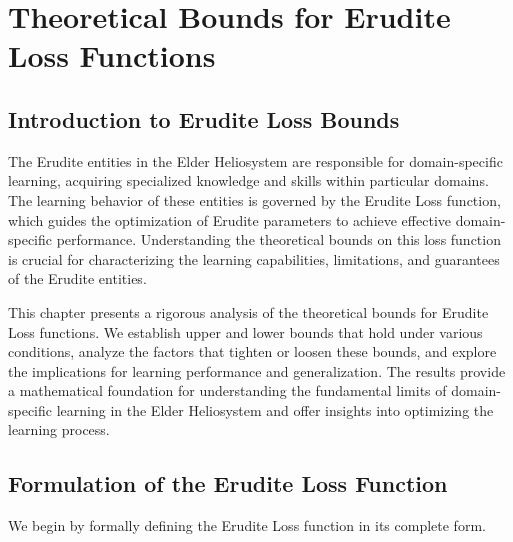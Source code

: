 \chapter{Theoretical Bounds for Erudite Loss Functions}

\section{Introduction to Erudite Loss Bounds}

The Erudite entities in the Elder Heliosystem are responsible for domain-specific learning, acquiring specialized knowledge and skills within particular domains. The learning behavior of these entities is governed by the Erudite Loss function, which guides the optimization of Erudite parameters to achieve effective domain-specific performance. Understanding the theoretical bounds on this loss function is crucial for characterizing the learning capabilities, limitations, and guarantees of the Erudite entities.

This chapter presents a rigorous analysis of the theoretical bounds for Erudite Loss functions. We establish upper and lower bounds that hold under various conditions, analyze the factors that tighten or loosen these bounds, and explore the implications for learning performance and generalization. The results provide a mathematical foundation for understanding the fundamental limits of domain-specific learning in the Elder Heliosystem and offer insights into optimizing the learning process.

\section{Formulation of the Erudite Loss Function}

We begin by formally defining the Erudite Loss function in its complete form.

